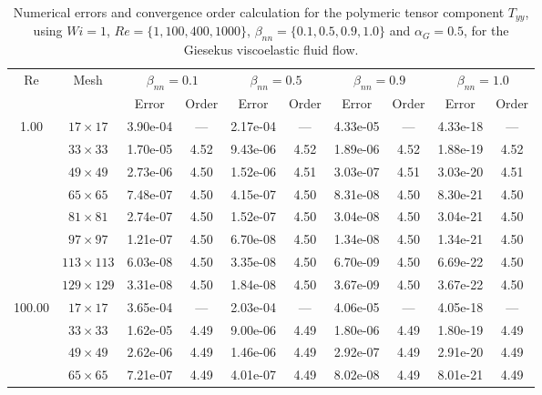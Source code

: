 \documentclass[preprint, 12pt]{elsarticle}
\begin{document}
\begin{center}
\begin{table}[H]
\caption{Numerical errors and convergence order calculation for the polymeric tensor component $T_{yy}$, using \mbox{$Wi=1$}, $Re=\{1,100,400,1000\}$, $\beta_{nn}=\{0.1,0.5,0.9,1.0\}$ and \mbox{$\alpha_G = 0.5$}, for the Giesekus viscoelastic fluid flow.\label{tab_GiesekusTyyalphaG05Resumida}}
\scriptsize{
    \begin{tabular*}{\textwidth}{@{\extracolsep\fill}cccccccccc@{}}
    \hline
    \multirow{2}{*}{$\operatorname{Re}$} & \multirow{2}{*}{Mesh} & \multicolumn{2}{c}{$\beta_{nn}=0.1$}  & \multicolumn{2}{c}{$\beta_{nn}=0.5$}  & \multicolumn{2}{c}{$\beta_{nn}=0.9$}  & \multicolumn{2}{c}{$\beta_{nn}=1.0$}\\ %
     & & Error & Order & Error & Order & Error & Order & Error & Order \\
    \hline
    \multirow{7}{*}{1.00} & $17\times 17$ & 3.90e-04 & --- & 2.17e-04 & --- & 4.33e-05 & --- & 4.33e-18 & --- \\
    & $33\times 33$ & 1.70e-05 & 4.52 & 9.43e-06 & 4.52 & 1.89e-06 & 4.52 & 1.88e-19 & 4.52 \\
    & $49\times 49$ & 2.73e-06 & 4.50 & 1.52e-06 & 4.51 & 3.03e-07 & 4.51 & 3.03e-20 & 4.51 \\
    & $65\times 65$ & 7.48e-07 & 4.50 & 4.15e-07 & 4.50 & 8.31e-08 & 4.50 & 8.30e-21 & 4.50 \\
    & $81\times 81$ & 2.74e-07 & 4.50 & 1.52e-07 & 4.50 & 3.04e-08 & 4.50 & 3.04e-21 & 4.50 \\
    & $97\times 97$ & 1.21e-07 & 4.50 & 6.70e-08 & 4.50 & 1.34e-08 & 4.50 & 1.34e-21 & 4.50 \\
    & $113\times 113$ & 6.03e-08 & 4.50 & 3.35e-08 & 4.50 & 6.70e-09 & 4.50 & 6.69e-22 & 4.50 \\
    & $129\times 129$ & 3.31e-08 & 4.50 & 1.84e-08 & 4.50 & 3.67e-09 & 4.50 & 3.67e-22 & 4.50 \\
    \hline\hline
    \multirow{7}{*}{100.00} & $17\times 17$ & 3.65e-04 & --- & 2.03e-04 & --- & 4.06e-05 & --- & 4.05e-18 & --- \\
    & $33\times 33$ & 1.62e-05 & 4.49 & 9.00e-06 & 4.49 & 1.80e-06 & 4.49 & 1.80e-19 & 4.49 \\
    & $49\times 49$ & 2.62e-06 & 4.49 & 1.46e-06 & 4.49 & 2.92e-07 & 4.49 & 2.91e-20 & 4.49 \\
    & $65\times 65$ & 7.21e-07 & 4.49 & 4.01e-07 & 4.49 & 8.02e-08 & 4.49 & 8.01e-21 & 4.49 \\

\end{tabular*}}
\end{table}
\end{center}
\end{document}
